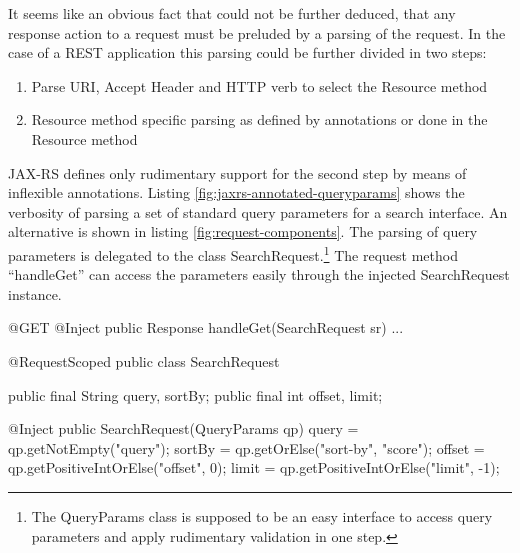 \documentclass[12pt,a4paper,twoside]{scrartcl}		%
\begin{document}
It seems like an obvious fact that could not be further deduced, that any
response action to a request must be preluded by a parsing of the request. In
the case of a REST application this parsing could be further divided in two
steps:
\begin{enumerate}
\item Parse URI, Accept Header and HTTP verb to select the Resource method
\item Resource method specific parsing as defined by annotations or done in the
  Resource method
\end{enumerate}

JAX-RS defines only rudimentary support for the second step by means of
inflexible annotations. Listing \ref{fig:jaxrs-annotated-queryparams} shows the
verbosity of parsing a set of standard query parameters for a search
interface. An alternative is shown in listing \ref{fig:request-components}. The
parsing of query parameters is delegated to the class
SearchRequest.\footnote{The QueryParams class is supposed to be an easy
  interface to access query parameters and apply rudimentary validation in one
  step.} The request method ``handleGet'' can access the parameters easily
through the injected SearchRequest instance.

\begin{javalisting}[label=fig:jaxrs-annotated-queryparams,
                   caption={Verbosity of parsing Requests with JAX-RS}]
@Get public Response get(@QueryParam("query") String query,
                         @QueryParam("sort-by") String sortBy,
                         @QueryParam("offset") int offset,
                         @QueryParam("limit") int limit ) {
\end{javalisting}

\begin{javalisting}[label=fig:request-components,
                   caption={Separating Request parsing from the Resource method}]
@GET @Inject
public Response handleGet(SearchRequest sr) { ... }

@RequestScoped
public class SearchRequest {
    public final String query, sortBy;
    public final int offset, limit;
    
    @Inject public SearchRequest(QueryParams qp) {
        query = qp.getNotEmpty("query");
        sortBy = qp.getOrElse("sort-by", "score");
        offset = qp.getPositiveIntOrElse("offset", 0);
        limit = qp.getPositiveIntOrElse("limit", -1);
    }
}
\end{javalisting}
\end{document}

